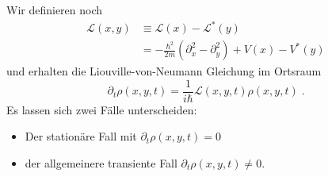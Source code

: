 Wir definieren noch
\begin{align}
  \mathcal{L}(x,y) &\equiv \mathcal{L}(x) - \mathcal{L}^*(y)\\
   &= -\frac{\hbar^2}{2m}\left( \partial_x^2 - \partial_y^2 \right) + V(x) - V^*(y)
\end{align}
und erhalten die Liouville-von-Neumann Gleichung im Ortsraum
\begin{equation}
  \partial_t \rho(x,y,t) = \frac{1}{i\hbar} \mathcal{L}(x,y,t) \rho(x,y,t) \; .
  \label{eq:lvn_first}
\end{equation}
Es lassen sich zwei Fälle unterscheiden:
\begin{itemize}
  \item Der stationäre Fall mit $\partial_t \rho(x,y,t) = 0$
  \item der allgemeinere transiente Fall $\partial_t \rho(x,y,t) \neq 0$.
\end{itemize}

